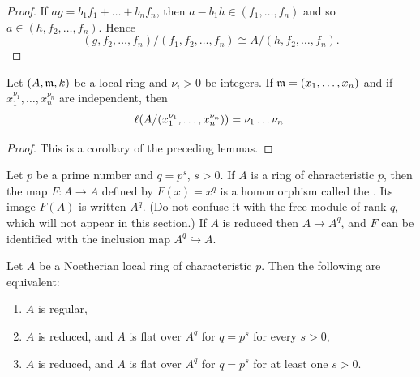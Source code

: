 \documentclass[../main]{subfiles}
\begin{document}
\begin{proof}
If $a g=b_1 f_1+\ldots+b_n f_n$, then $a-b_1 h \in(f_1, \ldots, f_n)$ and so \newline $a \in(h, f_2, \ldots, f_n)$. Hence \[(g, f_2, \ldots, f_n) /(f_1, f_2, \ldots, f_n) \cong A /(h, f_2, \ldots, f_n).\]
\end{proof}

\begin{lemma}\label{lem:42.03}
Let $(A, \mathfrak{m}, k)$ be a local ring and $\nu_i>0$ be integers. If $\mathfrak{m}=(x_1, \dots, x_n)$ and if $x_1^{\nu_1}, \ldots, x_n^{\nu_n}$ are independent, then \[\ell(A /(x_1^{\nu_1}, \dots, x_n^{\nu_n}))=\nu_1 \dots \nu_n.\]
\end{lemma}

\begin{proof}
This is a corollary of the preceding lemmas.
\end{proof}

\newparagraph Let $p$ be a prime number and $q=p^s$, $s>0$. If $A$ is a ring of characteristic $p$, then the map $F: A\longrightarrow A$ defined by $F(x)=x^q$ is a homomorphism called the . Its image $F(A)$ is written $A^q$. (Do not confuse it with the free module of rank $q$, which will not appear in this section.) If $A$ is reduced then $A\longrightarrow A^q$, and $F$ can be identified with the inclusion map $A^q \hookrightarrow A$.

\begin{theorem}[E. Kunz]\label{thm:107}
Let $A$ be a Noetherian local ring of characteristic $p$. Then the following are equivalent: 
\begin{enumerate}[label=(\arabic*)]
    \item $A$ is regular,
    \item $A$ is reduced, and $A$ is flat over $A^q$ for $q=p^s$ for every $s>0$,
    \item $A$ is reduced, and $A$ is flat over $A^q$ for $q=p^s$ for at least one $s>0$.
\end{enumerate}
\end{theorem}
\end{document}
